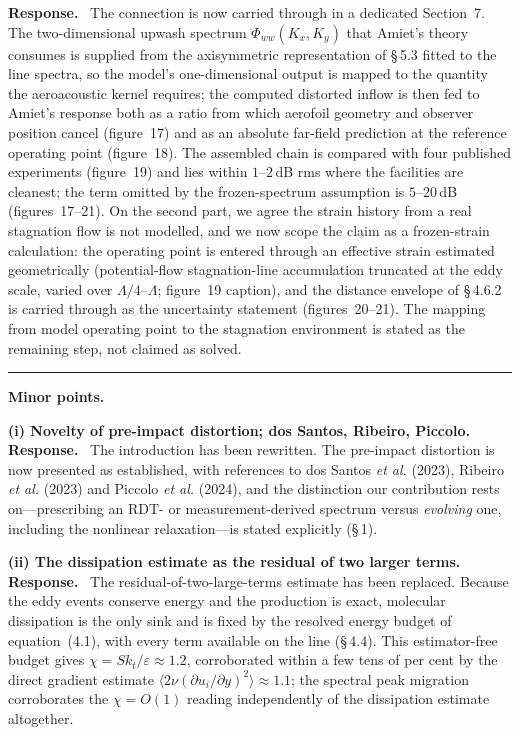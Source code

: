 \documentclass[11pt]{article}
\newcommand{\response}{\medskip\noindent\textbf{Response.}\ }
\newcommand{\point}[1]{\bigskip\noindent\textbf{#1}}
\begin{document}
\response
The connection is now carried through in a dedicated Section~7. The
two-dimensional upwash spectrum $\Phi_{ww}(K_x,K_y)$ that Amiet's theory
consumes is supplied from the axisymmetric representation of \S\,5.3 fitted
to the line spectra, so the model's one-dimensional output is mapped to the
quantity the aeroacoustic kernel requires; the computed distorted inflow is
then fed to Amiet's response both as a ratio from which aerofoil geometry
and observer position cancel (figure~17) and as an absolute far-field
prediction at the reference operating point (figure~18). The assembled
chain is compared with four published experiments (figure~19) and lies
within $1$--$2$\,dB rms where the facilities are cleanest; the term omitted
by the frozen-spectrum assumption is $5$--$20$\,dB (figures~17--21). On the
second part, we agree the strain history from a real stagnation flow is not
modelled, and we now scope the claim as a frozen-strain calculation: the
operating point is entered through an effective strain estimated
geometrically (potential-flow stagnation-line accumulation truncated at the
eddy scale, varied over $\Lambda/4$--$\Lambda$; figure~19 caption), and the
distance envelope of \S\,4.6.2 is carried through as the uncertainty
statement (figures~20--21). The mapping from model operating point to the
stagnation environment is stated as the remaining step, not claimed as
solved.

\bigskip
\hrule
\bigskip
\noindent\textbf{Minor points.}

\point{(i) Novelty of pre-impact distortion; dos Santos, Ribeiro, Piccolo.}
\response
The introduction has been rewritten. The pre-impact distortion is now
presented as established, with references to dos Santos \textit{et al.}
(2023), Ribeiro \textit{et al.} (2023) and Piccolo \textit{et al.} (2024),
and the distinction our contribution rests on---prescribing an RDT- or
measurement-derived spectrum versus \emph{evolving} one, including the
nonlinear relaxation---is stated explicitly (\S\,1).

\point{(ii) The dissipation estimate as the residual of two larger terms.}
\response
The residual-of-two-large-terms estimate has been replaced. Because the
eddy events conserve energy and the production is exact, molecular
dissipation is the only sink and is fixed by the resolved energy budget of
equation~(4.1), with every term available on the line (\S\,4.4). This
estimator-free budget gives $\chi=Sk_t/\varepsilon\approx1.2$, corroborated
within a few tens of per cent by the direct gradient estimate
$\langle 2\nu(\partial u_i/\partial y)^2\rangle\approx1.1$; the spectral
peak migration corroborates the $\chi=O(1)$ reading independently of the
dissipation estimate altogether.
\end{document}
